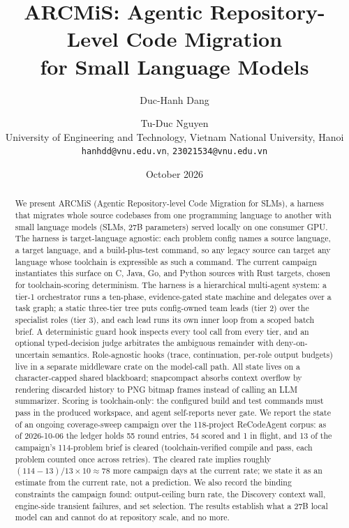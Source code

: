 \documentclass[11pt]{article}
\title{ARCMiS: Agentic Repository-Level Code Migration\\for Small Language Models}
\author{Duc-Hanh Dang \and Tu-Duc Nguyen\\
University of Engineering and Technology, Vietnam National University, Hanoi\\
\texttt{hanhdd@vnu.edu.vn}, \texttt{23021534@vnu.edu.vn}}
\date{October 2026}
\begin{document}
\maketitle

\begin{abstract}
We present ARCMiS (Agentic Repository-level Code Migration for SLMs), a
harness that migrates whole source codebases from one programming
language to another with small language models (SLMs, 27B parameters)
served locally on one consumer GPU. The harness is target-language
agnostic: each problem config names a source language, a target
language, and a build-plus-test command, so any legacy source can
target any language whose toolchain is expressible as such a command.
The current campaign instantiates this surface on C, Java, Go, and
Python sources with Rust targets, chosen for toolchain-scoring
determinism. The harness is a hierarchical multi-agent
system: a tier-1 orchestrator runs a ten-phase, evidence-gated state
machine and delegates over a task graph; a static three-tier tree puts
config-owned team leads (tier 2) over the specialist roles (tier 3), and
each lead runs its own inner loop from a scoped batch brief. A
deterministic guard hook inspects every tool call from every
tier, and an optional typed-decision judge arbitrates the ambiguous
remainder with deny-on-uncertain semantics. Role-agnostic hooks (trace,
continuation, per-role output budgets) live in a separate middleware
crate on the model-call path. All state lives on a
character-capped shared blackboard; snapcompact absorbs context overflow
by rendering discarded history to PNG bitmap frames instead of calling an
LLM summarizer. Scoring is toolchain-only: the configured build and test
commands must pass in the produced workspace, and agent self-reports
never gate. We report the state of an ongoing coverage-sweep campaign
over the 118-project ReCodeAgent corpus: as of 2026-10-06 the ledger
holds 55 round entries, 54 scored and 1 in flight, and 13 of the
campaign's 114-problem brief is
cleared (toolchain-verified compile and pass, each problem counted once
across retries). The cleared rate implies roughly $(114-13)/13 \times 10
\approx 78$ more campaign days at the current rate; we state it as an
estimate from the current rate, not a prediction. We also record the
binding constraints the campaign found: output-ceiling burn rate, the
Discovery context wall, engine-side transient failures, and set
selection. The results establish what a 27B local model can and cannot
do at repository scale, and no more.
\end{abstract}
\end{document}
